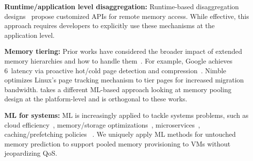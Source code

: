 %




\vfive
{\ni\bf Runtime/application level disaggregation:}
Runtime-based disaggregation designs~\cite{aifm.osdi20, semeru.osdi20,
kona.asplos21} propose customized APIs for remote memory access.
While effective, this approach requires
developers to explicitly use these mechanisms at the application level.



\vfive
{\ni\bf Memory tiering:}
%
Prior works have considered the broader impact of extended memory
hierarchies and how to handle them~\cite{softfarmem.asplos19,
heteroos.isca17, thermostat.asplos17, flatflash.asplos19,
autotiering.atc21}. For example,
Google
achieves 6\us\ latency via proactive hot\slash cold page
detection and compression~\cite{zswap.web20, softfarmem.asplos19}.
%
Nimble~\cite{nimblepage.asplos19} optimizes Linux's page tracking mechanism to
tier pages for increased migration bandwidth.
%
%
\sys takes a different ML-based approach looking at memory pooling design at the platform-level and is orthogonal
to these works.
%

\vfive
{\ni\bf ML for systems:}
%
ML is increasingly applied to tackle systems problems,
such as cloud efficiency~\cite{smartharvest.eurosys21,
resourcecentral.sosp17}, memory\slash storage
optimizations~\cite{mldistore.mlsys21, llama.asplos20},
microservices~\cite{sinan.asplos21}, caching\slash prefetching policies
~\cite{nmprefetch.asplos21, dlcache.micro19}. We uniquely apply ML methods
for untouched memory prediction to support pooled memory provisioning to VMs
without jeopardizing QoS.

